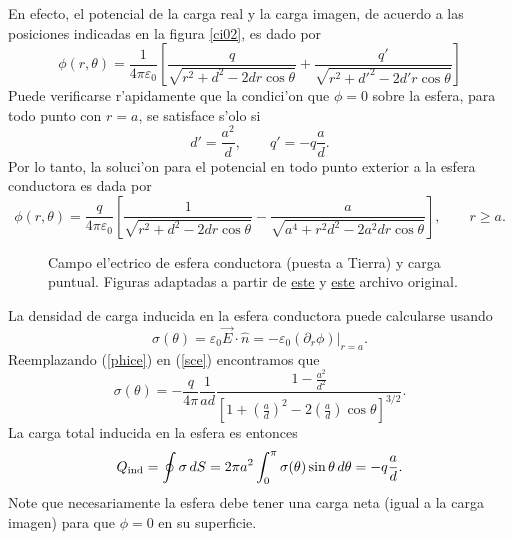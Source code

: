 En efecto, el potencial de la carga real y la carga imagen, de acuerdo a las posiciones indicadas en la figura \ref{ci02}, es dado por
\begin{equation}
 \phi(r,\theta)=\frac{1}{4\pi\varepsilon_0}\left[\frac{q}{\sqrt{
r^2+d^2-2dr\cos\theta } } +\frac{q'}{\sqrt{r^2+d'^2-2d'r\cos\theta}}\right]
\end{equation}
Puede verificarse r'apidamente que la condici'on que $\phi=0$ sobre la esfera, para todo punto con $r=a$, se satisface s'olo si
\begin{equation}
 d'=\frac{a^2}{d}, \qquad q'=-q\frac{a}{d}.
\end{equation}
Por lo tanto, la soluci'on para el potencial en todo punto exterior a la
esfera conductora es dada por
\begin{equation}\label{phice}
 \phi(r,\theta)=\frac{q}{4\pi\varepsilon_0}\left[\frac{1}{\sqrt{
r^2+d^2-2dr\cos\theta}}
-\frac{a}{\sqrt{a^4+r^2d^2-2a^2dr\cos\theta}}\right], \qquad r\ge a .
\end{equation}
\begin{center}
\begin{figure}[H]
\centerline{
\hspace{2cm}}
\caption{Campo el'ectrico de esfera conductora (puesta a Tierra) y carga puntual. 
Figuras adaptadas a partir de  \href{http://commons.wikimedia.org/wiki/File:VFPt_metal_ball_grounded.svg}{este} y \href{http://commons.wikimedia.org/wiki/File:VFPt_metal_ball_grounded_transparent.svg}{este} archivo original.}
\label{fig:eyc}
\end{figure}
\end{center}
La densidad de carga inducida en la esfera conductora puede calcularse usando
\begin{equation}\label{sce}
 \sigma(\theta)=\varepsilon_0\vec{E}\cdot\hat{n}
=-\varepsilon_0\left.(\partial_r\phi)\right|_{r=a}.
\end{equation}
Reemplazando (\ref{phice}) en (\ref{sce}) encontramos que
\begin{equation}
 \sigma(\theta)=-\frac{q}{4\pi}\frac{1}{ad}\frac{1-\frac{a^2}{d^2
}}{\left[1+\left(\frac{a}{d}\right)^2-2\left(\frac{a}{d}\right)\cos\theta\right]
^{3/2}}.
\end{equation}
La carga total inducida en la esfera es entonces
\begin{equation}
 Q_{\rm ind}=\oint\sigma\,dS=2\pi
a^2\int_0^\pi\sigma(\theta)\sin\theta\,d\theta=-q\frac{a}{d}.
\end{equation}
Note que necesariamente la esfera debe tener una carga neta (igual a la carga imagen) para que $\phi=0$ en su superficie.

